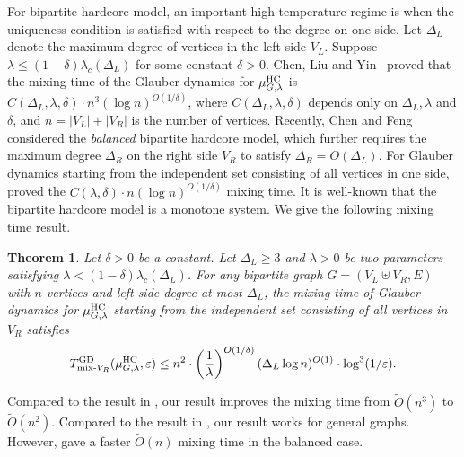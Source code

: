 \documentclass[11pt,a4paper]{article}
\renewcommand{\epsilon}{\varepsilon}
\newtheorem{theorem}{Theorem}[section]
\theoremstyle{definition}
\begin{document}
For bipartite hardcore model, an important high-temperature regime is when the uniqueness condition is satisfied with respect to the degree on one side.
Let $\Delta_L$ denote the maximum degree of vertices in the left side $V_L$. Suppose $\lambda \leq (1-\delta)\lambda_c(\Delta_L)$ for some constant $\delta > 0$. Chen, Liu and Yin~\cite{Chen0Y23} proved that the mixing time of the Glauber dynamics for $\mu^{\textnormal{HC}}_{G,\lambda}$ is $C(\Delta_L, \lambda, \delta) \cdot n^3 (\log n)^{O(1/\delta)}$, where $C(\Delta_L, \lambda, \delta)$ depends only on $\Delta_L, \lambda$ and $\delta$, and $n = |V_L| + |V_R|$ is the number of vertices. 
Recently, Chen and Feng~\cite{chenfeng2024rapid} considered the \emph{balanced} bipartite hardcore model, which further requires the maximum degree $\Delta_R$ on the right side $V_R$ to satisfy $\Delta_R = O(\Delta_L)$. 
For Glauber dynamics starting from the independent set consisting of all vertices in one side, \cite{chenfeng2024rapid} proved the $C(\lambda, \delta) \cdot n (\log n)^{O(1/\delta)}$ mixing time.
It is well-known that the bipartite hardcore model is a monotone system.
We give the following mixing time result.

\begin{theorem}\label{thm:bhc-mixing-time}
Let $\delta > 0$ be a constant. Let $\Delta_L \geq 3$ and $\lambda > 0$ be two parameters satisfying $\lambda < (1-\delta)\lambda_c(\Delta_L)$. For any bipartite graph $G=(V_L \uplus V_R,E)$ with $n$ vertices and left side degree at most $\Delta_L$, the mixing time of Glauber dynamics for $\mu^{\textnormal{HC}}_{G,\lambda}$ starting from the independent set consisting of all vertices in $V_R$ satisfies 
\[T^{\textnormal{GD}}_{\textnormal{mix-}V_R}(\mu_{G,\lambda}^{\textnormal{HC}},\epsilon)\leq n^2 \cdot \left(\frac{1}{\lambda}\right)^{O(1/\delta)}  (\Delta_L\log n)^{O(1)} \cdot \log^3(1/\epsilon).\]
\end{theorem}

Compared to the result in \cite{Chen0Y23}, our result improves the mixing time from $\tilde{O}(n^3)$ to $\tilde{O}(n^2)$.
Compared to the result in \cite{chenfeng2024rapid}, our result works for general graphs. However, \cite{chenfeng2024rapid} gave a faster $\tilde{O}(n)$ mixing time in the balanced case.
\end{document}

